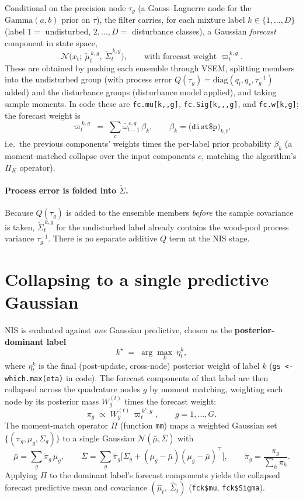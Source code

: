 \documentclass{article}
\newcommand{\Norm}{\mathcal{N}}
\newcommand{\chmu}{\check{\mu}}
\newcommand{\chSig}{\check{\Sigma}}
\begin{document}
Conditional on the precision node $\tau_g$ (a Gauss--Laguerre node for the
$\mathrm{Gamma}(a,b)$ prior on $\tau$), the filter carries, for each mixture label
$k \in \{1,\dots,D\}$ (label $1 =$ undisturbed, $2,\dots,D =$ disturbance classes), a
Gaussian \emph{forecast} component in state space,
\[
  \Norm\!\big(x_t;\ \chmu_t^{\,k,g},\ \chSig_t^{\,k,g}\big),
  \qquad \text{with forecast weight } \varpi_t^{\,k,g}.
\]
These are obtained by pushing each ensemble through VSEM, splitting members into the
undisturbed group (with process error $Q(\tau_g)=\mathrm{diag}(q_l,q_s,\tau_g^{-1})$
added) and the disturbance groups (disturbance model applied), and taking sample moments.
In code these are \lstinline{fc.mu[k,,g]}, \lstinline{fc.Sig[k,,,g]}, and
\lstinline{fc.w[k,g]}; the forecast weight is
\[
  \varpi_t^{\,k,g} \;=\; \sum_{c} \bar\omega^{\,c,g}_{t-1}\, \beta_k,
  \qquad \beta_k = \big(\texttt{dist\$p}\big)_{k,t},
\]
i.e.\ the previous components' weights times the per-label prior probability $\beta_k$
(a moment-matched collapse over the input components $c$, matching the algorithm's
$\Pi_K$ operator).

\paragraph{Process error is folded into $\chSig$.}
Because $Q(\tau_g)$ is added to the ensemble members \emph{before} the sample covariance
is taken, $\chSig_t^{\,k,g}$ for the undisturbed label already contains the wood-pool
process variance $\tau_g^{-1}$. There is no separate additive $Q$ term at the NIS stage.

\section{Collapsing to a single predictive Gaussian}

NIS is evaluated against \emph{one} Gaussian predictive, chosen as the
\textbf{posterior-dominant label}
\[
  k^\star \;=\; \arg\max_{k}\ \eta_t^{k},
\]
where $\eta_t^{k}$ is the final (post-update, cross-node) posterior weight of label $k$
(\lstinline{gs <- which.max(eta)} in code). The forecast components of that label are
then collapsed across the quadrature nodes $g$ by moment matching, weighting each node by
its posterior mass $W_g^{(t)}$ times the forecast weight:
\[
  \pi_g \;\propto\; W_g^{(t)}\,\varpi_t^{\,k^\star,g}, \qquad g = 1,\dots,G .
\]
The moment-match operator $\Pi$ (function \lstinline{mm}) maps a weighted Gaussian set
$\{(\pi_g, \mu_g, \Sigma_g)\}$ to a single Gaussian $\Norm(\bar\mu,\bar\Sigma)$ with
\[
  \bar\mu = \sum_g \tilde\pi_g\, \mu_g,
  \qquad
  \bar\Sigma = \sum_g \tilde\pi_g\Big[\Sigma_g + (\mu_g-\bar\mu)(\mu_g-\bar\mu)^\top\Big],
  \qquad \tilde\pi_g = \frac{\pi_g}{\sum_h \pi_h}.
\]
Applying $\Pi$ to the dominant label's forecast components yields the collapsed forecast
predictive mean and covariance $(\hat\mu_t,\ \hat\Sigma_t)$ (\lstinline{fck$mu},
\lstinline{fck$Sigma}).
\end{document}
